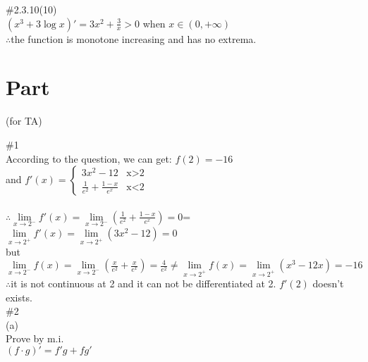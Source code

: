 \documentclass{article}
\begin{document}
\textcolor[rgb]{0.00,0.00,0.50}{\#2.3.10(10)}\\

$(x^3+3\log x)'=3x^2+\displaystyle\frac{3}{x}>0$ when $x\in(0,+\infty)$\\

$\therefore$\qquad the function is monotone increasing and has no extrema.\\

\section{\textcolor[rgb]{0.70,0.00,0.00}{Part \uppercase\expandafter{}}}(for TA)

\vspace{3.5mm}

\textcolor[rgb]{0.00,0.00,0.50}{\#1}\\

According to the question, we can  get: $f(2)=-16$\\

and $f'(x)=\begin{cases}
3x^2-12 & \text{x$>$2}\\
\displaystyle\frac{1}{e^2}+\frac{1-x}{e^x}& \text{x$<$2}
\end{cases}$\\

\quad\\

$\therefore$\qquad$\lim \limits_{x \to 2^-}f'(x)=\lim \limits_{x \to 2^-}\left(\frac{1}{e^2}+\frac{1-x}{e^x}\right)=0$=$\lim \limits_{x \to 2^+}f'(x)=\lim \limits_{x \to 2^+}\left(3x^2-12\right)=0$\\

but $\displaystyle\lim \limits_{x \to 2^-}f(x)=\lim \limits_{x \to 2^-}\left(\displaystyle\frac{x}{e^2}+\frac{x}{e^x}\right)=\frac{4}{e^2}\neq\lim \limits_{x \to 2^+}f(x)=\lim \limits_{x \to 2^+}(x^3-12x)=-16$\\

$\therefore$\qquad it is not continuous at 2 and it can not be differentiated at 2. $f'(2)$ doesn't exists.\\

\textcolor[rgb]{0.00,0.00,0.50}{\#2}\\

(a)\\

Prove by m.i.\\

$(f\cdot g)'=f'g+fg'$\\
\end{document}
